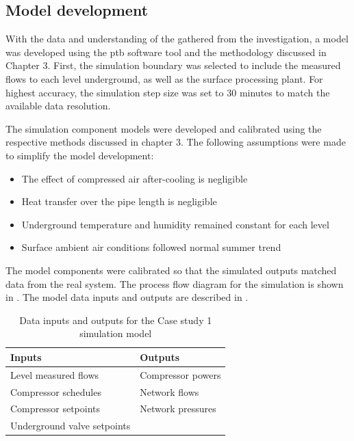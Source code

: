 \subsection{Model development}
With the data and understanding of the gathered from the investigation, a model was developed using the \gls{ptb} software tool and the methodology discussed in Chapter 3. First, the simulation boundary was selected to include the measured flows to each level underground, as well as the surface processing plant. For highest accuracy, the simulation step size was set to 30 minutes to match the available data resolution.
\par
The simulation component models were developed and calibrated using the respective methods discussed in chapter 3. The following assumptions were made to simplify the model development:
\begin{itemize}
	\item The effect of compressed air after-cooling is negligible
	\item Heat transfer over the pipe length is negligible
	\item Underground temperature and humidity remained constant for each level
	\item Surface ambient air conditions followed normal summer trend
\end{itemize} 
The model components were calibrated so that the simulated outputs matched data from the real system. The process flow diagram for the simulation is shown in . The model data inputs and outputs are described in .

\begin{table}[h!]
	\centering
	\begin{tabular}{ll}
		\hline
		Inputs \hspace*{4cm} &Outputs \hspace*{4cm} \\ \hline
		Level measured flows&Compressor powers \\
		Compressor schedules& Network flows \\
		Compressor setpoints& Network pressures \\
		Underground valve setpoints& \\
		\hline
	\end{tabular}
	\caption{Data inputs and outputs for the Case study 1 simulation model }
	\label{table: Mine A inputs/outputs}
\end{table}


